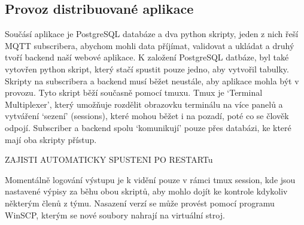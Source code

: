 \subsection{Provoz distribuované aplikace}
Součásí aplikace je PostgreSQL databáze a dva python skripty, jeden z nich řeší MQTT subscribera, abychom mohli data příjímat, validovat a ukládat a druhý tvoří backend naší webové aplikace.
K založení PostgreSQL datbáze, byl také vytovřen python skript, který stačí spustit pouze jedno, aby vytvořil tabulky. Skripty na subscribera a backend musí běžet neustále, aby aplikace mohla být v provozu.
Tyto skript běží současně pomocí tmuxu. Tmux je `Terminal Multiplexer', který umožňuje rozdělit obrazovku terminálu na více panelů a vytváření `sezení' (sessions), které mohou běžet i na pozadí, poté co se člověk odpojí.
Subscriber a backend spolu `komunikují' pouze přes databázi, ke které mají oba skripty přístup.

ZAJISTI AUTOMATICKY SPUSTENI PO RESTARTu

Momentálně logování výstupu je k vidění pouze v rámci tmux session, kde jsou nastavené výpisy za běhu obou skriptů, aby mohlo dojít ke kontrole kdykoliv některým členů z týmu. 
Nasazení verzí se může provést pomocí programu WinSCP, kterým se nové soubory nahrají na virtuální stroj.